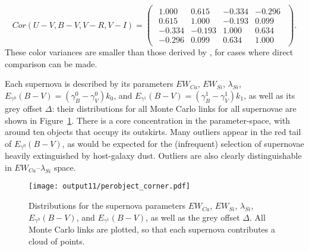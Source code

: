 \documentclass{aastex61}   	%
\begin{document}
 \begin{equation}
 Cor(U-V, B-V, V-R, V-I)=
\begin{pmatrix}
\begin{array}{rrrr}
1.000 & 0.615 & -0.334 & -0.296 \\
0.615 & 1.000 & -0.193 & 0.099 \\
-0.334 & -0.193 & 1.000 & 0.634 \\
-0.296 & 0.099 & 0.634 & 1.000 
\end{array}
\end{pmatrix}.
  \label{color_cor:eqn}
 \end{equation}
These color variances are smaller than those derived by \citet{2003A&A...404..901N, 2007ApJ...659..122J}, for cases where direct comparison can be made.

Each supernova is described by its parameters $EW_{Ca}$, $EW_{Si}$, $\lambda_{Si}$, $E_{\gamma^0}(B-V)=(\gamma^0_B-\gamma^0_V)k_0$, and
$E_{\gamma^1}(B-V)=(\gamma^1_B-\gamma^1_V)k_1$, as well as its grey offset
$\Delta$: their distributions for all Monte Carlo links for all supernovae are shown in Figure~\ref{perobject:fig}.
There is a core concentration in the  parameter-space, with around ten objects that occupy its outskirts.
Many outliers appear in the red tail of $E_{\gamma^0}(B-V)$, as would be expected for the (infrequent) selection of supernovae
heavily extinguished by host-galaxy dust.
Outliers  are also clearly distinguishable in  $EW_{Ca}$--$\lambda_{Si}$ space.

\begin{figure}[htbp] %
   \centering
   \texttt{[image: output11/perobject\_corner.pdf]} 
   \caption{Distributions for the supernova parameters $EW_{Ca}$, $EW_{Si}$, $\lambda_{Si}$, $E_{\gamma^0}(B-V)$, and $E_{\gamma^1}(B-V)$, as well as the grey offset
$\Delta$.  All Monte Carlo links are plotted, so that each supernova contributes a cloud of points.
   \label{perobject:fig}}
\end{figure}
\end{document}
